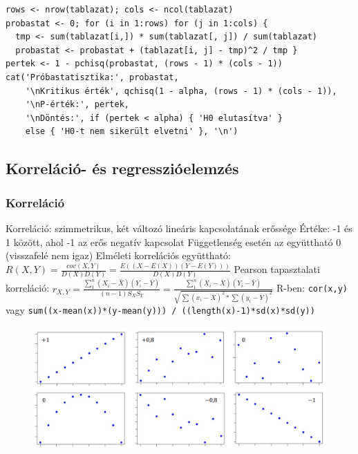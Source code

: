 \documentclass[12pt,a4paper]{article}
\begin{document}
\begin{verbatim}
rows <- nrow(tablazat); cols <- ncol(tablazat)
probastat <- 0; for (i in 1:rows) for (j in 1:cols) {
  tmp <- sum(tablazat[i,]) * sum(tablazat[, j]) / sum(tablazat)
  probastat <- probastat + (tablazat[i, j] - tmp)^2 / tmp }
pertek <- 1 - pchisq(probastat, (rows - 1) * (cols - 1))
cat('Próbastatisztika:', probastat,
    '\nKritikus érték', qchisq(1 - alpha, (rows - 1) * (cols - 1)),
    '\nP-érték:', pertek,
    '\nDöntés:', if (pertek < alpha) { 'H0 elutasítva' }
    else { 'H0-t nem sikerült elvetni' }, '\n')
\end{verbatim}

\pagebreak

\subsection{Korreláció- és regresszióelemzés}

\subsubsection{Korreláció}

\begin{outline}
	\1 Korreláció: szimmetrikus, két változó lineáris kapcsolatának erőssége
	\1 Értéke: -1 és 1 között, ahol -1 az erős negatív kapcsolat
		\2 Függetlenség esetén az együttható 0 (visszafelé nem igaz)
	\1 Elméleti korrelációs együttható: $R(X,Y) = \frac{cov(X,Y)}{D(X)D(Y)}
	= \frac{E((X-E(X))(Y-E(Y)))}{D(X)D(Y)}$
	\1 Pearson tapasztalati korreláció: $r_{X,Y} =
	\frac{\sum_{1}^{n}(X_i - \overline{X})(Y_i - \overline{Y})}{(n-1 )S_X S_Y}
	= \frac{\sum_{1}^{n}(X_i - \overline{X})(Y_i - \overline{Y})}
	{\sqrt{ \sum (x_i - \overline{X})^2 * \sum (y_i - \overline{Y})^2 }}$
		\2 R-ben: \texttt{cor(x,y)}\\
		vagy \texttt{sum((x-mean(x))*(y-mean(y))) / ((length(x)-1)*sd(x)*sd(y))}
\end{outline}

\begin{figure}[h!]
	\centering
	\includegraphics[width=0.7\linewidth]{korreláció}
\end{figure}
\end{document}
